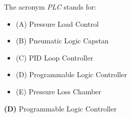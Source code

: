 

The acronym {\it PLC} stands for:

\begin{itemize}
\item{(A)} Pressure Load Control
\vskip 5pt 
\item{(B)} Pneumatic Logic Capstan
\vskip 5pt 
\item{(C)} PID Loop Controller
\vskip 5pt 
\item{(D)} Programmable Logic Controller
\vskip 5pt 
\item{(E)} Pressure Loss Chamber
\end{itemize}







{\bf (D)} Programmable Logic Controller
 










